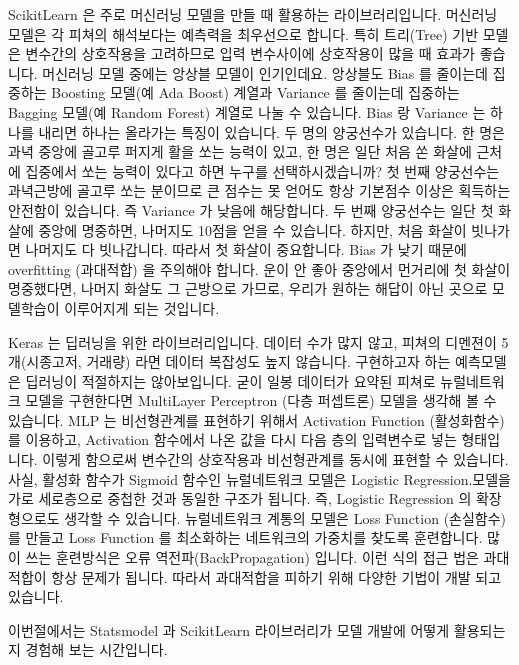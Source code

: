\documentclass[letterpaper,10pt,english]{jupyterBook}
\begin{document}
\sphinxAtStartPar
Scikit\sphinxhyphen{}Learn 은 주로 머신러닝 모델을 만들 때 활용하는 라이브러리입니다. 머신러닝 모델은 각 피쳐의 해석보다는 예측력을 최우선으로 합니다. 특히 트리(Tree) 기반 모델은 변수간의 상호작용을 고려하므로 입력 변수사이에 상호작용이 많을 때 효과가 좋습니다. 머신러닝 모델 중에는 앙상블 모델이 인기인데요. 앙상블도 Bias 를 줄이는데 집중하는 Boosting  모델(예 Ada Boost) 계열과 Variance 를 줄이는데 집중하는 Bagging 모델(예 Random Forest) 계열로 나눌 수 있습니다. Bias 랑 Variance 는 하나를 내리면 하나는 올라가는 특징이 있습니다. 두 명의 양궁선수가 있습니다. 한 명은 과녁 중앙에 골고루 퍼지게 활을 쏘는 능력이 있고, 한 명은 일단 처음 쏜 화살에 근처에 집중에서 쏘는 능력이 있다고 하면 누구를 선택하시겠습니까? 첫 번째 양궁선수는 과녁근방에 골고루 쏘는 분이므로 큰 점수는 못 얻어도 항상 기본점수 이상은 획득하는 안전함이 있습니다. 즉 Variance 가 낮음에 해당합니다. 두 번째 양궁선수는  일단 첫 화살에 중앙에 명중하면, 나머지도 10점을 얻을 수 있습니다. 하지만, 처음 화살이 빗나가면 나머지도 다 빗나갑니다. 따라서 첫 화살이 중요합니다. Bias 가 낮기 때문에 overfitting (과대적합) 을 주의해야 합니다. 운이 안 좋아 중앙에서 먼거리에 첫 화살이 명중했다면, 나머지 화살도 그  근방으로 가므로, 우리가 원하는 해답이 아닌 곳으로 모델학습이 이루어지게 되는 것입니다.

\sphinxAtStartPar
Keras 는 딥러닝을 위한 라이브러리입니다. 데이터 수가 많지 않고,  피쳐의 디멘젼이 5 개(시종고저, 거래량) 라면 데이터 복잡성도 높지 않습니다. 구현하고자 하는 예측모델은 딥러닝이 적절하지는 않아보입니다. 굳이 일봉 데이터가 요약된 피쳐로 뉴럴네트워크 모델을 구현한다면  Multi\sphinxhyphen{}Layer Perceptron (다층 퍼셉트론) 모델을 생각해 볼 수 있습니다. MLP 는 비선형관계를 표현하기 위해서 Activation Function (활성화함수) 를 이용하고,  Activation 함수에서 나온 값을 다시 다음 층의 입력변수로 넣는 형태입니다. 이렇게 함으로써 변수간의 상호작용과 비선형관계를 동시에 표현할 수 있습니다. 사실, 활성화 함수가 Sigmoid  함수인 뉴럴네트워크 모델은 Logistic Regression.모델을 가로 세로층으로 중첩한 것과 동일한 구조가 됩니다. 즉, Logistic Regression 의 확장형으로도 생각할 수 있습니다.  뉴럴네트워크 계통의 모델은 Loss Function (손실함수) 를 만들고 Loss Function 를 최소화하는 네트워크의 가중치를 찾도록 훈련합니다. 많이 쓰는 훈련방식은 오류 역전파(BackPropagation) 입니다. 이런 식의 접근 법은 과대적합이 항상 문제가 됩니다. 따라서 과대적합을 피하기 위해 다양한 기법이 개발 되고 있습니다.

\sphinxAtStartPar
이번절에서는 Statsmodel 과 Scikit\sphinxhyphen{}Learn 라이브러리가 모델 개발에 어떻게 활용되는지 경험해 보는 시간입니다.
\end{document}
